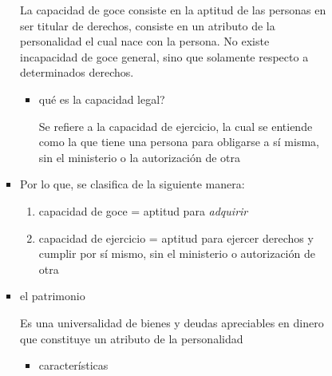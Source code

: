 \documentclass[]{article}
\providecommand{\tightlist}{%
  \setlength{\itemsep}{0pt}\setlength{\parskip}{0pt}}
\begin{document}
\begin{itemize}
\begin{itemize}
\begin{enumerate}
\begin{itemize}
\begin{itemize}
          La capacidad de goce consiste en la aptitud de las personas en
          ser titular de derechos, consiste en un atributo de la
          personalidad el cual nace con la persona. No existe
          incapacidad de goce general, sino que solamente respecto a
          determinados derechos.

          \begin{itemize}
          \item
            qué es la capacidad legal?

            Se refiere a la capacidad de ejercicio, la cual se entiende
            como la que tiene una persona para obligarse a sí misma, sin
            el ministerio o la autorización de otra
          \end{itemize}
        \item
          Por lo que, se clasifica de la siguiente manera:

          \begin{enumerate}
          \def\labelenumii{\alph{enumii})}
          \item
            capacidad de goce = aptitud para \emph{adquirir}
          \item
            capacidad de ejercicio = aptitud para ejercer derechos y
            cumplir por sí mismo, sin el ministerio o autorización de
            otra
          \end{enumerate}
        \item
          el patrimonio

          Es una universalidad de bienes y deudas apreciables en dinero
          que constituye un atributo de la personalidad

          \begin{itemize}
          \tightlist
          \item
            características


\end{itemize}
\end{itemize}
\end{itemize}
\end{enumerate}
\end{itemize}
\end{itemize}
\end{document}
